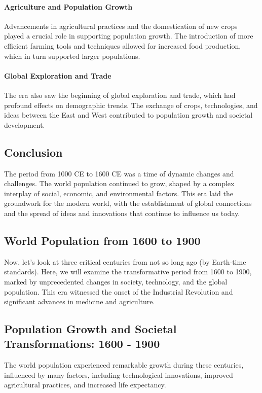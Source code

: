 \documentclass[a4paper,12pt]{book}
\begin{document}
\paragraph{Agriculture and Population Growth}
Advancements in agricultural practices and the domestication of new crops played a crucial role in supporting population growth. The introduction of more efficient farming tools and techniques allowed for increased food production, which in turn supported larger populations.

\paragraph{Global Exploration and Trade}
The era also saw the beginning of global exploration and trade, which had profound effects on demographic trends. The exchange of crops, technologies, and ideas between the East and West contributed to population growth and societal development.

\subsection*{Conclusion}
The period from 1000 CE to 1600 CE was a time of dynamic changes and challenges. The world population continued to grow, shaped by a complex interplay of social, economic, and environmental factors. This era laid the groundwork for the modern world, with the establishment of global connections and the spread of ideas and innovations that continue to influence us today.

\subsection*{World Population from 1600 to 1900}
Now, let's look at three critical centuries from not so long ago (by Earth-time standards). Here, we will examine the transformative period from 1600 to 1900, marked by unprecedented changes in society, technology, and the global population. This era witnessed the onset of the Industrial Revolution and significant advances in medicine and agriculture.

\subsection*{Population Growth and Societal Transformations: 1600 - 1900}
The world population experienced remarkable growth during these centuries, influenced by many factors, including technological innovations, improved agricultural practices, and increased life expectancy.
\end{document}
